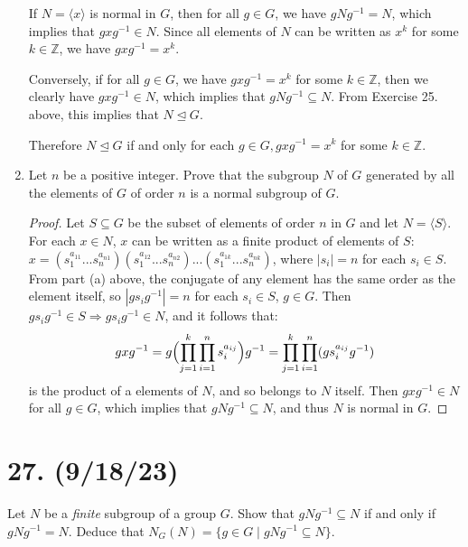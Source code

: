 \documentclass{article}
\begin{document}
\begin{enumerate}[label=(\alph*), itemsep=0em]
          If $N = \langle x \rangle$ is normal in $G$, then for all $g \in G$, we have $gNg^{-1} = N$, which implies that $gxg^{-1} \in N$. Since all elements of $N$ can be written as $x^k$ for some $k \in \mathbb{Z}$, we have $gxg^{-1} = x^k$.

          Conversely, if for all $g \in G$, we have $gxg^{-1} = x^k$ for some $k \in \mathbb{Z}$, then we clearly have $gxg^{-1} \in N$, which implies that $gNg^{-1} \subseteq N$. From Exercise 25. above, this implies that $N \unlhd G$.

          Therefore $N \unlhd G$ if and only for each $g \in G, gxg^{-1} = x^k$ for some $k \in \mathbb{Z}$.
    \item Let $n$ be a positive integer. Prove that the subgroup $N$ of $G$ generated by all the elements of $G$ of order $n$ is a normal subgroup of $G$.
          \begin{proof}
            Let $S \subseteq G$ be the subset of elements of order $n$ in $G$ and let $N = \langle S \rangle$. For each $x \in N$, $x$ can be written as a finite product of elements of $S$: $x = (s_1^{a_{11}}...s_n^{a_{n1}})(s_1^{a_{12}}...s_n^{a_{n2}})...(s_1^{a_{1k}}...s_n^{a_{nk}})$, where $|s_i| = n$ for each $s_i \in S$. From part (a) above, the conjugate of any element has the same order as the element itself, so $|gs_ig^{-1}| = n$ for each $s_i \in S$, $g \in G$. Then $gs_ig^{-1} \in S \Rightarrow gs_ig^{-1} \in N$, and it follows that:
            \begin{equation*}
                gxg^{-1} = g \Bigl( \prod_{j = 1}^{k} \prod_{i = 1}^{n} s_i^{a_{ij}} \Bigr) g^{-1} = \prod_{j = 1}^{k} \prod_{i = 1}^{n} (g s_i^{a_{ij}} g^{-1})
            \end{equation*}
            is the product of a elements of $N$, and so belongs to $N$ itself. Then $gxg^{-1} \in N$ for all $g \in G$, which implies that $gNg^{-1} \subseteq N$, and thus $N$ is normal in $G$.
          \end{proof}
\end{enumerate}

\section*{27. (9/18/23)}

Let $N$ be a \emph{finite} subgroup of a group $G$. Show that $gNg^{-1} \subseteq N$ if and only if $gNg^{-1} = N$. Deduce that $N_G(N) = \{ g \in G \mid gNg^{-1} \subseteq N \}$.
\end{document}
